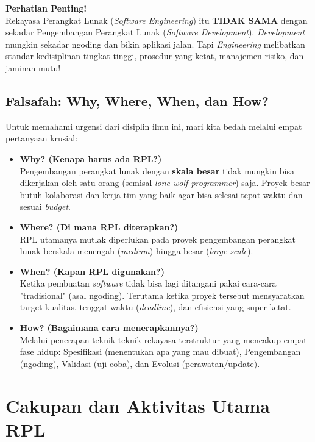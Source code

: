 \documentclass[12pt,a4paper]{article}
\begin{document}
\begin{notebox}
\textbf{Perhatian Penting!} \\
Rekayasa Perangkat Lunak (\textit{Software Engineering}) itu \textbf{TIDAK SAMA} dengan sekadar Pengembangan Perangkat Lunak (\textit{Software Development}). \textit{Development} mungkin sekadar ngoding dan bikin aplikasi jalan. Tapi \textit{Engineering} melibatkan standar kedisiplinan tingkat tinggi, prosedur yang ketat, manajemen risiko, dan jaminan mutu!
\end{notebox}

\subsection{Falsafah: Why, Where, When, dan How?}
Untuk memahami urgensi dari disiplin ilmu ini, mari kita bedah melalui empat pertanyaan krusial:

\begin{itemize}
    \item \textbf{Why? (Kenapa harus ada RPL?)}\\
    Pengembangan perangkat lunak dengan \textbf{skala besar} tidak mungkin bisa dikerjakan oleh satu orang (semisal \textit{lone-wolf programmer}) saja. Proyek besar butuh kolaborasi dan kerja tim yang baik agar bisa selesai tepat waktu dan sesuai \textit{budget}.
    \item \textbf{Where? (Di mana RPL diterapkan?)}\\
    RPL utamanya mutlak diperlukan pada proyek pengembangan perangkat lunak berskala menengah (\textit{medium}) hingga besar (\textit{large scale}).
    \item \textbf{When? (Kapan RPL digunakan?)}\\
    Ketika pembuatan \textit{software} tidak bisa lagi ditangani pakai cara-cara "tradisional" (asal ngoding). Terutama ketika proyek tersebut mensyaratkan target kualitas, tenggat waktu (\textit{deadline}), dan efisiensi yang super ketat.
    \item \textbf{How? (Bagaimana cara menerapkannya?)}\\
    Melalui penerapan teknik-teknik rekayasa terstruktur yang mencakup empat fase hidup: Spesifikasi (menentukan apa yang mau dibuat), Pengembangan (ngoding), Validasi (uji coba), dan Evolusi (perawatan/update).
\end{itemize}

\newpage
\section{Cakupan dan Aktivitas Utama RPL}
\end{document}
